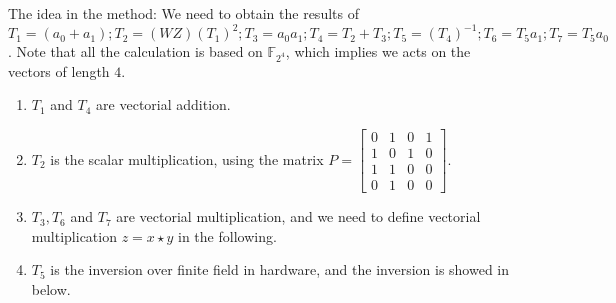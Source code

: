 \documentclass[8pt,oneside]{article}
\newcommand{\0}{\textbf{0}}
\newcommand{\1}{\textbf{1}}
\newcommand{\F}{\mathbb{F}}
\begin{document}
    The idea in the method: We need to obtain the results of $ T_1=(a_0+a_1);T_2=(WZ) (T_1 )^2;T_3=a_0 a_1;T_4=T_2+T_3;T_5=(T_4 )^{-1};T_6=T_5 a_1;T_7=T_5 a_0 $. 
    Note that all the calculation is based on $ \F_{2^4} $, which implies we acts on the vectors of length $ 4 $.
    \begin{enumerate}
        \item $ T_1 $ and $ T_4 $ are vectorial addition.
        \item $ T_2 $ is the scalar  multiplication, using the matrix $ P=\begin{bmatrix}
            0 &1 &0 &1\\
            1 &0 &1 &0\\
            1 &1 &0 &0\\
            0 &1 &0 &0
        \end{bmatrix} $.
        \item $ T_3, T_6 $ and $ T_7 $ are vectorial multiplication, 
        and we need to define vectorial multiplication $ z=x\star y $ in the following. 
        \item $ T_5 $ is the inversion over finite field in hardware, and the inversion is showed in below.
    \end{enumerate}
\end{document}

